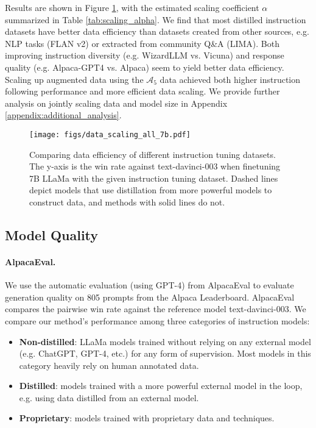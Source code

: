 Results are  shown in Figure \ref{fig:data_scaling_all_7b}, with the estimated scaling coefficient $\alpha$ summarized in Table \ref{tab:scaling_alpha}. 
We find that most distilled instruction datasets have better data efficiency than datasets created from other sources, e.g. NLP tasks (FLAN v2) or extracted from community Q\&A (LIMA). Both improving instruction diversity (e.g. WizardLLM vs. Vicuna) and response quality (e.g. Alpaca-GPT4 vs. Alpaca) seem to yield better data efficiency. Scaling up augmented data using the $\mathcal{A}_5$  data achieved both higher instruction following performance and more efficient data scaling. We provide further analysis on jointly scaling data and model size in Appendix \ref{appendix:additional_analysis}. 
\begin{figure}
  \centering
  \texttt{[image: figs/data\_scaling\_all\_7b.pdf]}
  \caption{Comparing data efficiency of different instruction tuning datasets. The y-axis is the win rate against text-davinci-003 when finetuning 7B LLaMa with the given instruction tuning dataset.
  Dashed lines depict models that use distillation from more powerful models to construct data, and methods with solid lines do not.
  }
  \label{fig:data_scaling_all_7b}
\end{figure}

\subsection{Model Quality}
\paragraph{AlpacaEval.} We use the automatic evaluation (using GPT-4) from AlpacaEval to evaluate generation quality on 805 prompts from the  Alpaca Leaderboard.  AlpacaEval compares the pairwise win rate against the reference model text-davinci-003. We compare our method's performance among three categories of instruction models: 
\begin{itemize}[leftmargin=*]
    \item \textbf{Non-distilled}: LLaMa models trained without relying on any external model (e.g. ChatGPT, GPT-4, etc.) for any form of supervision. Most models in this category heavily rely on human annotated data. 
    \item \textbf{Distilled}: models trained with a more powerful external model in the loop, e.g. using data distilled from an external model.
    \item \textbf{Proprietary}: models trained with proprietary data and techniques. 
\end{itemize}

